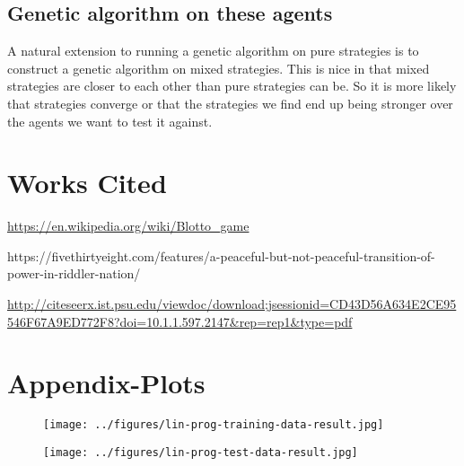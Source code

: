 \documentclass[12pt,letter]{article}
\begin{document}
\subsection{Genetic algorithm on these agents}
A natural extension to running a genetic algorithm on pure strategies is to construct a genetic algorithm on mixed strategies. This is nice in that mixed strategies are closer to each other than pure strategies can be. So it is more likely that strategies converge or that the strategies we find end up being stronger over the agents we want to test it against.

\section{Works Cited} %

\begin{thebibliography}{9}
\url{https://en.wikipedia.org/wiki/Blotto_game}
 
{https://fivethirtyeight.com/features/a-peaceful-but-not-peaceful-transition-of-power-in-riddler-nation/}
 
\url{http://citeseerx.ist.psu.edu/viewdoc/download;jsessionid=CD43D56A634E2CE95546F67A9ED772F8?doi=10.1.1.597.2147&rep=rep1&type=pdf}
\end{thebibliography}

\clearpage

\section{Appendix-Plots}

\begin{figure}[h!]
\texttt{[image: ../figures/lin-prog-training-data-result.jpg]}
\centering
\end{figure}

\begin{figure}[h!]
\texttt{[image: ../figures/lin-prog-test-data-result.jpg]}
\centering
\end{figure}
\end{document}
